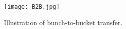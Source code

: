 %
%
%
\begin{figure}[H]
   \centering   
   \texttt{[image: B2B.jpg]}
   \caption{Illustration of bunch-to-bucket transfer.}
   \label{B2B}
\end{figure}

